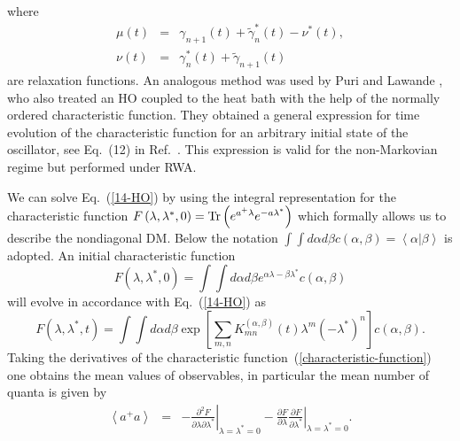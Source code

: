 \documentclass[12pt,twoside,a4paper]{report}
\begin{document}
where
\begin{eqnarray}
  \mu (t) &=&       \gamma_{n+1}(t)
            +\tilde{\gamma}_n^*(t)-\nu^{*}(t), \nonumber \\
  \nu (t) &=&       \gamma_n^{*}(t)
            +\tilde{\gamma}_{n+1}(t) \label{15-HO}
\end{eqnarray}
are relaxation functions. An analogous method was used by Puri and Lawande \cite{puri77},
who also treated an HO coupled to the heat bath with the help of the normally ordered characteristic function.
They obtained a general expression for time evolution
of the characteristic function for an arbitrary initial state of the oscillator,
see Eq.~(12) in Ref.~\cite{puri77}.
This expression is valid for the non-Markovian regime but
performed under RWA.

We can solve Eq.~(\ref{14-HO}) by using the
integral representation for the characteristic function 
$F\left( \lambda,\lambda ^{*},0\right) 
  ={\rm Tr}\left( 
                  e^{ a^{+} \lambda    }
                  e^{-a     \lambda^{*}}
              \right) $ 
which formally allows us  to describe the
nondiagonal DM. Below the notation 
$\int \int d\alpha d\beta c(\alpha ,\beta )
          =\left\langle 
                \alpha \right. \left| \beta
           \right\rangle $ 
is adopted. An initial characteristic function
\begin{equation}
  F\left( \lambda ,\lambda ^{*},0\right) 
   =\int \int d\alpha d\beta
              e^{\alpha \lambda -\beta \lambda ^{*}}
              c(\alpha ,\beta ) 
\label{16-HO}
\end{equation}
will evolve in accordance with 
Eq.~(\ref{14-HO}) as
\begin{equation}
  F\left( \lambda ,\lambda ^{*},t\right) 
    =\int \int d\alpha d\beta
         \exp 
            \left[
               \sum_{m,n}
                   K_{mn}^{(\alpha ,\beta )}(t)
                   \lambda^m\left( -\lambda ^{*}\right) ^n
            \right] 
            c(\alpha ,\beta ).
  \label{17-HO}
\end{equation}
Taking the derivatives of the characteristic function~(\ref{characteristic-function})
one obtains the mean values of observables, in particular 
the mean number of quanta is given by
\begin{eqnarray}
\left< a^+a \right> &=& 
-\left. \frac{\partial^2 F}{\partial \lambda \partial \lambda^*}                     \right|_{\lambda=\lambda^*=0}
-
 \left. \frac{\partial F}{\partial \lambda}                                          %
        \frac{\partial F}{\partial \lambda^*}                                        \right|_{\lambda=\lambda^*=0}.
\label{mean-quanta-cumulant}
\end{eqnarray}
\end{document}
